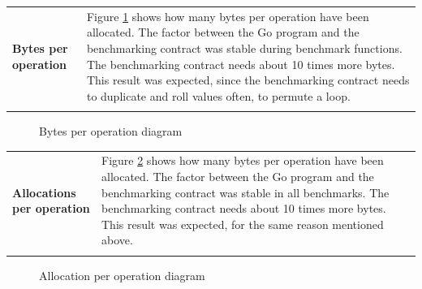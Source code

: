 \begin{tabular}[t]{ p{3cm} p{12.5cm}}
\raggedright
\textbf{Bytes per operation} &
Figure \ref{bperop} shows how many bytes per operation have been allocated. The factor between the Go program and the benchmarking contract was stable during benchmark functions. The benchmarking contract needs about 10 times more bytes. This result was expected, since the benchmarking contract needs to duplicate and roll values often, to permute a loop. \\ \\
\end{tabular}

\begin{figure}[H]
	\begin{center}
	\caption{Bytes per operation diagram}
	\label{bperop}
	\end{center}
\end{figure}

\begin{tabular}[t]{ p{3cm} p{12.5cm}}
\raggedright
\textbf{Allocations per operation} &
Figure \ref{aperop} shows how many bytes per operation have been allocated. The factor between the Go program and the benchmarking contract was stable in all benchmarks. The benchmarking contract needs about 10 times more bytes. This result was expected, for the same reason mentioned above. \\ \\
\end{tabular}

\begin{figure}[H]
	\begin{center}
	\caption{Allocation per operation diagram}
	\label{aperop}
	\end{center}
\end{figure}
